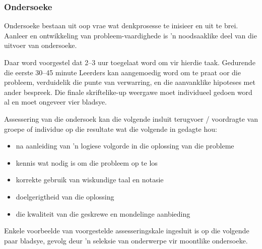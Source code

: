 \subsubsection{Ondersoeke}
Ondersoeke bestaan ​​uit oop vrae wat denkprosesse te inisieer en uit te brei. Aanleer en ontwikkeling van probleem-vaardighede is 'n noodsaaklike deel van die uitvoer van ondersoeke.

Daar word voorgestel dat 2--3 uur toegelaat word om vir hierdie taak. Gedurende die eerste 30--45 minute Leerders kan aangemoedig word om te praat oor die probleem, verduidelik die punte van verwarring, en die aanvanklike hipoteses met ander bespreek. Die finale skriftelike-up weergawe moet individueel gedoen word al en moet ongeveer vier bladsye.

Assessering van die ondersoek kan die volgende insluit terugvoer / voordragte van groepe of individue op die resultate wat die volgende in gedagte hou:
\begin{itemize}[noitemsep]
\item
  na aanleiding van 'n logiese volgorde in die oplossing van die probleme
\item
  kennis wat nodig is om die probleem op te los
\item
  korrekte gebruik van wiskundige taal en notasie
\item
  doelgerigtheid van die oplossing
\item
  die kwaliteit van die geskrewe en mondelinge aanbieding
\end{itemize}
Enkele voorbeelde van voorgestelde assesseringskale ingesluit is op die volgende paar bladsye, gevolg deur 'n seleksie van onderwerpe vir moontlike ondersoeke.

